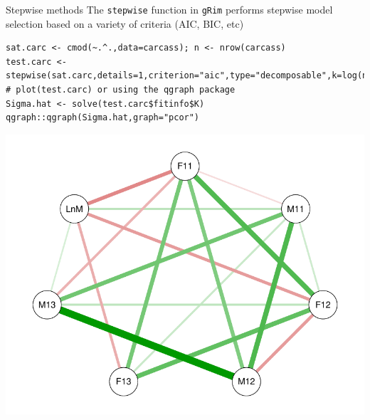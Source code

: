\documentclass[11pt,handout,aspectratio=169,dvipsnames]{beamer}
\begin{document}
\begin{frame}[fragile,label=carcass_stepwise]{Stepwise methods}
	The \texttt{stepwise} function in \texttt{gRim} performs stepwise model selection based on a variety of criteria (AIC, BIC, etc)	
	\begin{lstlisting}
sat.carc <- cmod(~.^.,data=carcass); n <- nrow(carcass)
test.carc <- stepwise(sat.carc,details=1,criterion="aic",type="decomposable",k=log(n))
# plot(test.carc) or using the qgraph package
Sigma.hat <- solve(test.carc$fitinfo$K)
qgraph::qgraph(Sigma.hat,graph="pcor") 
\end{lstlisting}
\begin{center}
\includegraphics[scale=.4]{pics/carcass}
\end{center}
\end{frame}
\end{document}
